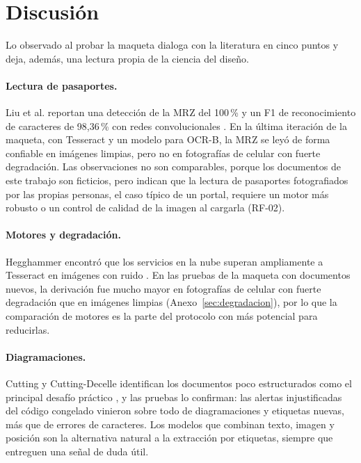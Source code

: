 \documentclass[11pt,a4paper]{article}
\begin{document}
\section{Discusión}
\label{sec:discusion}

Lo observado al probar la maqueta dialoga con la literatura en cinco puntos y deja, además, una lectura propia de la ciencia del diseño.

\paragraph{Lectura de pasaportes.} Liu et al. reportan una detección de la MRZ del 100\,\% y un F1 de reconocimiento de caracteres de 98,36\,\% con redes convolucionales \cite{liu2021}. En la última iteración de la maqueta, con Tesseract y un modelo para OCR-B, la MRZ se leyó de forma confiable en imágenes limpias, pero no en fotografías de celular con fuerte degradación. Las observaciones no son comparables, porque los documentos de este trabajo son ficticios, pero indican que la lectura de pasaportes fotografiados por las propias personas, el caso típico de un portal, requiere un motor más robusto o un control de calidad de la imagen al cargarla (RF-02).

\paragraph{Motores y degradación.} Hegghammer encontró que los servicios en la nube superan ampliamente a Tesseract en imágenes con ruido \cite{hegghammer2022}. En las pruebas de la maqueta con documentos nuevos, la derivación fue mucho mayor en fotografías de celular con fuerte degradación que en imágenes limpias (Anexo~\ref{sec:degradacion}), por lo que la comparación de motores es la parte del protocolo con más potencial para reducirlas.

\paragraph{Diagramaciones.} Cutting y Cutting-Decelle identifican los documentos poco estructurados como el principal desafío práctico \cite{cutting2021}, y las pruebas lo confirman: las alertas injustificadas del código congelado vinieron sobre todo de diagramaciones y etiquetas nuevas, más que de errores de caracteres. Los modelos que combinan texto, imagen y posición \cite{huang2022} son la alternativa natural a la extracción por etiquetas, siempre que entreguen una señal de duda útil.
\end{document}

